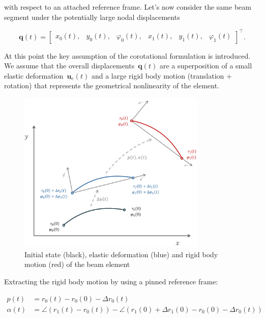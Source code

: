with respect to an attached reference frame.
Let's now consider the same beam segment under the potentially large nodal displacements

\begin{equation}
\boldsymbol{q}(t) = \begin{bmatrix}
x_{0}(t), & y_{0}(t), & \varphi_0(t), & x_{1}(t), & y_{1}(t), & \varphi_1(t)
\end{bmatrix}^\intercal.
\end{equation}

At this point the key assumption of the corotational formulation is introduced.
We assume that the overall displacements~$\boldsymbol{q}(t)$ are a superposition of a small elastic deformation~$\boldsymbol{u}_e(t)$ and a large rigid body motion (translation + rotation) that represents the geometrical nonlinearity of the element.

\begin{figure}[h]
\centering
\includegraphics[width=0.8\textwidth]{figures/elements/beam-element-corotational.pdf}
\caption{Initial state (black), elastic deformation (blue) and rigid body motion (red) of the beam element}
\label{fig:beam-element-corotatrional}
\end{figure}

Extracting the rigid body motion by using a pinned reference frame:

\begin{align}
p(t) &= r_{0}(t) - r_{0}(0) - \Delta r_0(t) \\
\alpha(t) &= \angle\left(r_1(t) - r_0(t)\right) - \angle\left(r_1(0) + \Delta r_1(0) - r_0(0) - \Delta r_0(t)\right)
\end{align}

